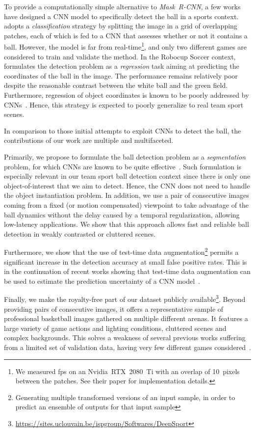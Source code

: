 \documentclass[sigconf, screen]{acmart}
\begin{document}
To provide a computationally simple alternative to \emph{Mask~R-CNN}, a few works have designed a CNN model to specifically detect the ball in a sports context.
\cite{Reno2018a} adopts a \emph{classification} strategy by splitting the image in a grid of overlapping patches, each of which is fed to a CNN that assesses whether or not it contains a ball. However, the model is far from real-time\footnote{We measured fps on an Nvidia~RTX~2080~Ti with an overlap of 10~pixels between the patches. See their paper for implementation details.}, and only two different games are considered to train and validate the method.
In the Robocup Soccer context, \cite{Speck2017a} formulates the detection problem as a \emph{regression} task aiming at predicting the coordinates of the ball in the image. The performance remains relatively poor despite the reasonable contrast
between the white ball and the green field. Furthermore, regression of object coordinates is known to be poorly addressed by CNNs~\cite{Liu2018}. Hence, this strategy is expected to poorly generalize to real team sport scenes.

In comparison to those initial attempts to exploit CNNs to detect the ball, the contributions of our work are multiple and multifaceted.

Primarily, we propose to formulate the ball detection problem as a \emph{segmentation} problem, for which CNNs are known to be quite effective~\cite{Chen2017a}. Such formulation is especially relevant in our team sport ball detection context since there is only one object-of-interest that we aim to detect. Hence, the CNN does not need to handle the object instantiation problem.
In addition, we use a pair of consecutive images coming from a fixed (or motion compensated) viewpoint to take advantage of the ball dynamics without the delay caused by a temporal regularization, allowing low-latency applications.
We show that this approach allows fast and reliable ball detection in weakly contrasted or cluttered scenes.

Furthermore, we show that the use of test-time data augmentation\footnote{Generating multiple transformed versions of an input sample, in order to predict an ensemble of outputs for that input sample} permits a significant increase in the detection accuracy at small false positive rates. This is in the continuation of recent works showing that test-time data augmentation can be used to estimate the prediction uncertainty of a CNN model~\cite{Ayhan2018, Wang2019}.

Finally, we make the royalty-free part of our dataset publicly available\footnote{\url{https://sites.uclouvain.be/ispgroup/Softwares/DeepSport}}.
Beyond providing pairs of consecutive images, it offers a representative sample of professional basketball images gathered on multiple different arenas. It features a large variety of game actions and lighting conditions, cluttered scenes and complex backgrounds. This solves a weakness of several previous works suffering from a limited set of validation data, having very few different games considered~\cite{Parisot2019b, Reno2018a, Speck2017a}.
\end{document}
